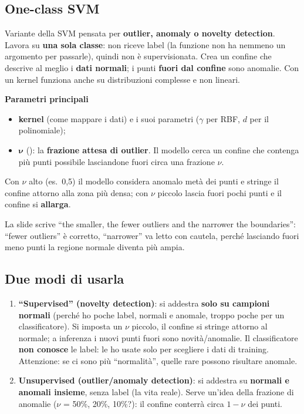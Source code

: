 \subsection{One-class SVM}
\begin{definizione}
Variante della SVM pensata per \textbf{outlier, anomaly o novelty detection}. Lavora su \textbf{una sola classe}: non riceve label (la funzione
non ha nemmeno un argomento per passarle), quindi non è supervisionata. Crea un confine che descrive al meglio i \textbf{dati normali}; i punti
\textbf{fuori dal confine} sono anomalie. Con un kernel funziona anche su distribuzioni complesse e non lineari.
\end{definizione}

\textbf{Parametri principali}
\begin{itemize}
  \item \textbf{kernel} (come mappare i dati) e i suoi parametri ($\gamma$ per RBF, $d$ per il polinomiale);
  \item $\bm{\nu}$ (): la \textbf{frazione attesa di outlier}. Il modello cerca un confine che contenga più punti possibile lasciandone
        fuori circa una frazione $\nu$.
\end{itemize}
Con $\nu$ alto (es.\ 0,5) il modello considera anomalo metà dei punti e stringe il confine attorno alla zona più densa; con $\nu$ piccolo lascia
fuori pochi punti e il confine si \textbf{allarga}.
\begin{verifica}
La slide scrive ``the smaller, the fewer outliers and the narrower the boundaries'': ``fewer outliers'' è corretto, ``narrower'' va letto
con cautela, perché lasciando fuori meno punti la regione normale diventa più ampia.
\end{verifica}

\subsection{Due modi di usarla}
\begin{enumerate}
  \item \textbf{``Supervised'' (novelty detection)}: si addestra \textbf{solo su campioni normali} (perché ho poche label, normali e anomale, troppo
        poche per un classificatore). Si imposta un $\nu$ piccolo, il confine si stringe attorno al normale; a inferenza i nuovi punti fuori sono
        novità/anomalie. Il classificatore \textbf{non conosce} le label: le ho usate solo per scegliere i dati di training. Attenzione: se ci sono più
        ``normalità'', quelle rare possono risultare anomale.
  \item \textbf{Unsupervised (outlier/anomaly detection)}: si addestra su \textbf{normali e anomali insieme}, senza label (la vita reale). Serve
        un'idea della frazione di anomalie ($\nu$ = 50\%, 20\%, 10\%?): il confine conterrà circa $1-\nu$ dei punti.
\end{enumerate}

